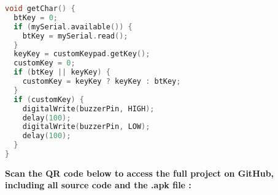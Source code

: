 \documentclass[a4paper, 12pt]{article}
\begin{document}
\begin{lstlisting}[language=C,caption={Arduino Source Code for Password Protected Door Lock},label={lst:source_code},basicstyle=\small\ttfamily]
void getChar() {
  btKey = 0;
  if (mySerial.available()) {
    btKey = mySerial.read();
  }
  keyKey = customKeypad.getKey();
  customKey = 0;
  if (btKey || keyKey) {
    customKey = keyKey ? keyKey : btKey;
  }
  if (customKey) {
    digitalWrite(buzzerPin, HIGH);
    delay(100);
    digitalWrite(buzzerPin, LOW);
    delay(100);
  }
}
\end{lstlisting}

\clearpage
\begin{center}
    \textbf{Scan the QR code below to access the full project on GitHub, including all source code and the .apk file :}
    \\
    \vspace{1em}
\end{center}
\end{document}
